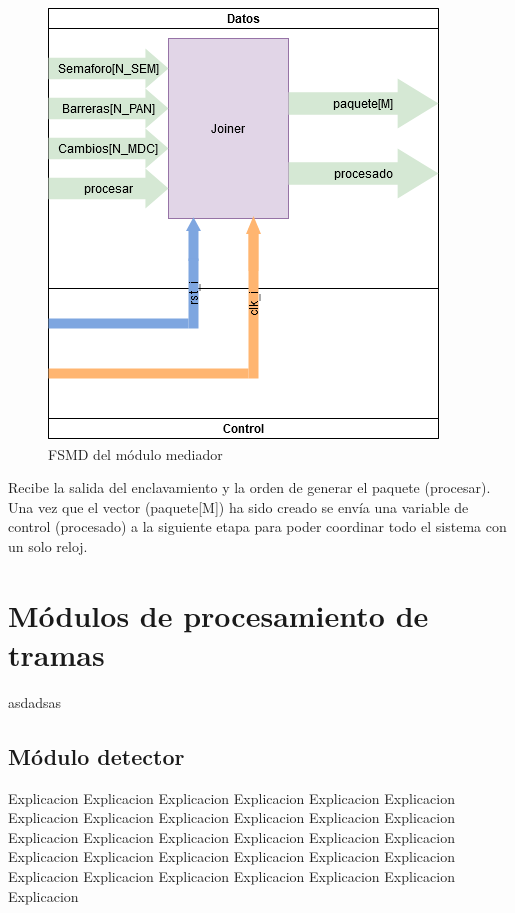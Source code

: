 		\begin{figure}[h]
		\centering
			\includegraphics[scale=.5]{./Figures/FSMD-Mediador}
			\caption{FSMD del módulo mediador}
			\label{fig:FSMD_Mediador}
		\end{figure}
		
		Recibe la salida del enclavamiento y la orden de generar el paquete (procesar). Una vez que el vector (paquete[M]) ha sido creado se envía una variable de control (procesado) a la siguiente etapa para poder coordinar todo el sistema con un solo reloj.
		
\section{Módulos de procesamiento de tramas}

	asdadsas
	
	\subsection{Módulo detector}
	
		Explicacion Explicacion Explicacion Explicacion Explicacion Explicacion Explicacion Explicacion Explicacion Explicacion Explicacion Explicacion Explicacion Explicacion Explicacion Explicacion Explicacion Explicacion Explicacion Explicacion Explicacion Explicacion Explicacion Explicacion Explicacion Explicacion Explicacion Explicacion Explicacion Explicacion Explicacion 
		
